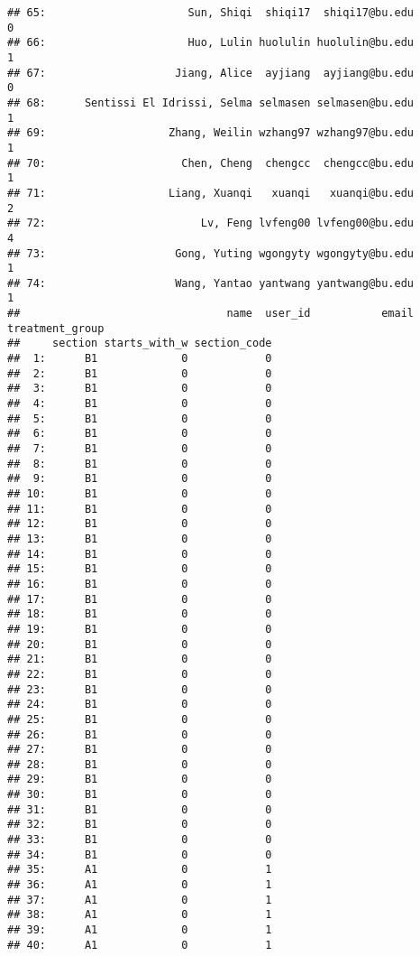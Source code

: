 \documentclass[
]{article}
\begin{document}
\begin{verbatim}
## 65:                      Sun, Shiqi  shiqi17  shiqi17@bu.edu               0
## 66:                      Huo, Lulin huolulin huolulin@bu.edu               1
## 67:                    Jiang, Alice  ayjiang  ayjiang@bu.edu               0
## 68:      Sentissi El Idrissi, Selma selmasen selmasen@bu.edu               1
## 69:                   Zhang, Weilin wzhang97 wzhang97@bu.edu               1
## 70:                     Chen, Cheng  chengcc  chengcc@bu.edu               1
## 71:                   Liang, Xuanqi   xuanqi   xuanqi@bu.edu               2
## 72:                        Lv, Feng lvfeng00 lvfeng00@bu.edu               4
## 73:                    Gong, Yuting wgongyty wgongyty@bu.edu               1
## 74:                    Wang, Yantao yantwang yantwang@bu.edu               1
##                                name  user_id           email treatment_group
##     section starts_with_w section_code
##  1:      B1             0            0
##  2:      B1             0            0
##  3:      B1             0            0
##  4:      B1             0            0
##  5:      B1             0            0
##  6:      B1             0            0
##  7:      B1             0            0
##  8:      B1             0            0
##  9:      B1             0            0
## 10:      B1             0            0
## 11:      B1             0            0
## 12:      B1             0            0
## 13:      B1             0            0
## 14:      B1             0            0
## 15:      B1             0            0
## 16:      B1             0            0
## 17:      B1             0            0
## 18:      B1             0            0
## 19:      B1             0            0
## 20:      B1             0            0
## 21:      B1             0            0
## 22:      B1             0            0
## 23:      B1             0            0
## 24:      B1             0            0
## 25:      B1             0            0
## 26:      B1             0            0
## 27:      B1             0            0
## 28:      B1             0            0
## 29:      B1             0            0
## 30:      B1             0            0
## 31:      B1             0            0
## 32:      B1             0            0
## 33:      B1             0            0
## 34:      B1             0            0
## 35:      A1             0            1
## 36:      A1             0            1
## 37:      A1             0            1
## 38:      A1             0            1
## 39:      A1             0            1
## 40:      A1             0            1

\end{verbatim}
\end{document}

